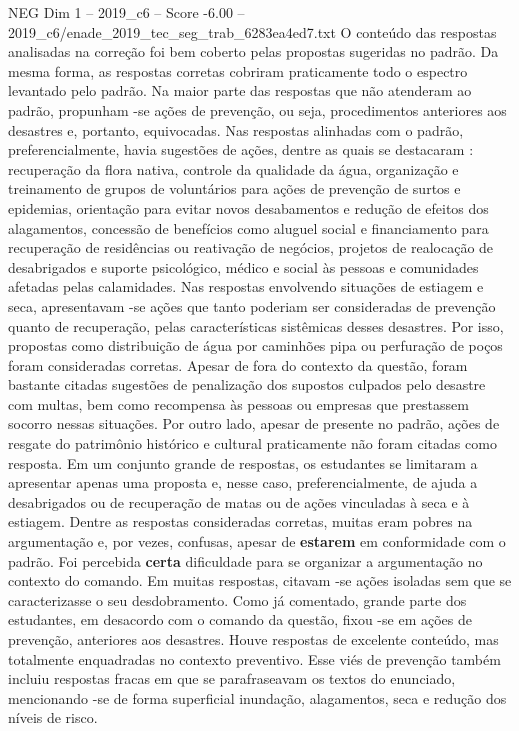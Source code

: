 \begin{textsample}{NEG Dim 1 – 2019\_c6 – Score -6.00 – 2019\_c6/enade\_2019\_tec\_seg\_trab\_6283ea4ed7.txt}
O conteúdo das respostas analisadas na correção foi bem coberto pelas propostas sugeridas no padrão.
Da mesma forma, as respostas corretas cobriram praticamente todo o espectro levantado pelo padrão.
Na maior parte das respostas que não atenderam ao padrão, propunham -se ações de prevenção, ou seja, procedimentos anteriores aos desastres e, portanto, equivocadas.
Nas respostas alinhadas com o padrão, preferencialmente, havia sugestões de ações, dentre as quais se destacaram : recuperação da flora nativa, controle da qualidade da água, organização e treinamento de grupos de voluntários para ações de prevenção de surtos e epidemias, orientação para evitar novos desabamentos e redução de efeitos dos alagamentos, concessão de benefícios como aluguel social e financiamento para recuperação de residências ou reativação de negócios, projetos de realocação de desabrigados e suporte psicológico, médico e social às pessoas e comunidades afetadas pelas calamidades.
Nas respostas envolvendo situações de estiagem e seca, apresentavam -se ações que tanto poderiam ser consideradas de prevenção quanto de recuperação, pelas características sistêmicas desses desastres.
Por isso, propostas como distribuição de água por caminhões pipa ou perfuração de poços foram consideradas corretas.
Apesar de fora do contexto da questão, foram bastante citadas sugestões de penalização dos supostos culpados pelo desastre com multas, bem como recompensa às pessoas ou empresas que prestassem socorro nessas situações.
Por outro lado, apesar de presente no padrão, ações de resgate do patrimônio histórico e cultural praticamente não foram citadas como resposta.
Em um conjunto grande de respostas, os estudantes se limitaram a apresentar apenas uma proposta e, nesse caso, preferencialmente, de ajuda a desabrigados ou de recuperação de matas ou de ações vinculadas à seca e à estiagem.
Dentre as respostas consideradas corretas, muitas eram pobres na argumentação e, por vezes, confusas, apesar de \textbf{estarem} em conformidade com o padrão.
Foi percebida \textbf{certa} dificuldade para se organizar a argumentação no contexto do comando.
Em muitas respostas, citavam -se ações isoladas sem que se caracterizasse o seu desdobramento.
Como já comentado, grande parte dos estudantes, em desacordo com o comando da questão, fixou -se em ações de prevenção, anteriores aos desastres.
Houve respostas de excelente conteúdo, mas totalmente enquadradas no contexto preventivo.
Esse viés de prevenção também incluiu respostas fracas em que se parafraseavam os textos do enunciado, mencionando -se de forma superficial inundação, alagamentos, seca e redução dos níveis de risco.

\end{textsample}
